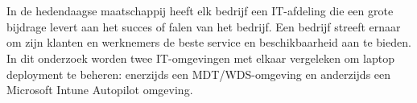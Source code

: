 
\chapter{}
\label{ch:inleiding}



In de hedendaagse maatschappij heeft elk bedrijf een IT-afdeling die een grote bijdrage levert aan het succes of falen van het bedrijf. Een bedrijf streeft ernaar om zijn klanten en werknemers de beste service en beschikbaarheid aan te bieden. In dit onderzoek worden twee IT-omgevingen met elkaar vergeleken om laptop deployment te beheren: enerzijds een MDT/WDS-omgeving en anderzijds een Microsoft Intune Autopilot omgeving.

\section{}
\label{sec:probleemstelling}

